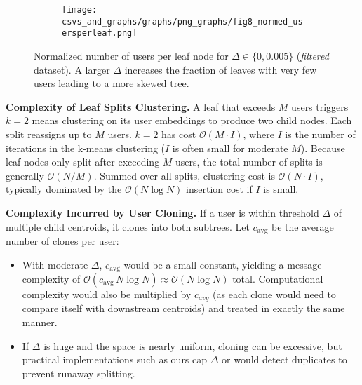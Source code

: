 \documentclass[10pt,journal]{IEEEtran}
\begin{document}
%             
\begin{figure}
    \centering
    \begin{subfigure}[b]{0.45\textwidth}
        \texttt{[image: csvs\_and\_graphs/graphs/png\_graphs/fig8\_normed\_usersperleaf.png]}
        \label{fig:recall/fig8_normed_users_per_leaf}
    \end{subfigure}
    \caption{Normalized number of users per leaf node for $\Delta \in \{0, 0.005\}$ (\textit{filtered} dataset). 
    A larger $\Delta$ increases the fraction of leaves with very few users leading to a more skewed tree.}
    \label{fig:normed_usersperleaf}
\end{figure}


\textbf{Complexity of Leaf Splits Clustering.}
A leaf that exceeds $M$ users triggers $k{=}2$ means clustering on its user embeddings to produce two child nodes. Each split reassigns up to $M$ users. $k{=}2$ has cost $\mathcal{O}(M \cdot I)$, where $I$ is the number of iterations in the k-means clustering ($I$ is often small for moderate $M$). Because leaf nodes only split after exceeding $M$ users, the total number of splits is generally $\mathcal{O}(N / M)$. Summed over all splits, clustering cost is $\mathcal{O}(N \cdot I)$, typically dominated by the $\mathcal{O}(N \log N)$ insertion cost if $I$ is small.

\textbf{Complexity Incurred by User Cloning.}
If a user is within threshold $\Delta$ of multiple child centroids, it clones into both subtrees. Let $c_{\text{avg}}$ be the average number of clones per user:
\begin{itemize}
    \item With moderate $\Delta$, $c_{\text{avg}}$ would be a small constant, yielding a message complexity of $\mathcal{O}(c_{\text{avg}} \, N \log N) \approx \mathcal{O}(N \log N)$ total. Computational complexity would also be multiplied by $c_{avg}$ (as each clone would need to compare itself with downstream centroids) and treated in exactly the same manner.
    \item If $\Delta$ is huge and the space is nearly uniform, cloning can be excessive, but practical implementations such as ours cap $\Delta$ or would detect duplicates to prevent runaway splitting.
\end{itemize}
\end{document}
